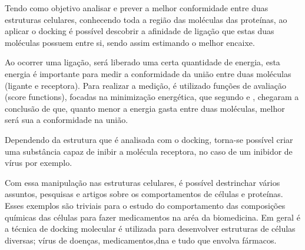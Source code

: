 \documentclass[tcc, capa]{texucpel}
\begin{document}
Tendo como objetivo analisar e prever a melhor conformidade entre duas estruturas celulares, conhecendo toda a região das moléculas das proteínas, ao aplicar o docking é possível descobrir a afinidade de ligação que estas duas moléculas possuem entre si, sendo assim estimando o melhor encaixe.
% 
% 

Ao ocorrer uma ligação, será liberado uma certa quantidade de energia, esta energia é importante para medir a conformidade da união entre duas moléculas (ligante e receptora).
Para realizar a medição, é utilizado funções de avaliação (score functions), focadas na minimização energética, que  segundo \cite{kitchen2004docking} e \cite{lybrand1995ligand}, chegaram a conclusão de que, quanto menor a energia gasta entre duas moléculas, melhor será sua a conformidade na união. 

Dependendo da estrutura que é analisada com o docking, torna-se possível criar uma substância capaz de inibir a molécula receptora, no caso de um inibidor de vírus por exemplo. \cite{ishikawa2011binding}

Com essa manipulação nas estruturas celulares, é possível destrinchar vários assuntos, pesquisas e artigos sobre os comportamentos de células e proteínas.
Esses exemplos são triviais para o estudo do comportamento das composições químicas das células para fazer medicamentos na aréa da biomedicina. 
Em geral é a técnica de docking molecular é utilizada para desenvolver estruturas de células diversas; vírus de doenças, medicamentos,dna e tudo que envolva fármacos. 
\end{document}
